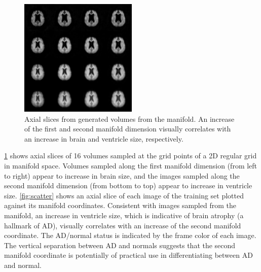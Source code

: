 \begin{figure}[tb!]
\centering
\includegraphics[width=0.5\textwidth, trim=0 0em 0 0]
  {figures/MICCAI2013_sampled2d}

\caption[Axial slices from generated volumes from the manifold]{Axial slices
from generated volumes from the manifold. An increase of the first and second manifold dimension visually correlates with an increase in
brain and ventricle size, respectively.}
\label{fig:generated}
\end{figure}

\ref{fig:generated} shows axial slices of 16 volumes sampled at the
grid points of a 2D regular grid in manifold space. Volumes sampled along the
first manifold dimension (from left to right) appear to increase in brain size,
and the images sampled along the second manifold dimension (from bottom to top)
appear to increase in ventricle size. \ref{fig:scatter} shows an axial slice of
each image of the training set plotted against its manifold coordinates.
Consistent with images sampled from the manifold, an increase in ventricle size,
which is indicative of brain atrophy (a hallmark of AD), visually correlates
with an increase of the second manifold coordinate.
The AD/normal status is indicated by the frame color of each image. The vertical
separation between AD and normals suggests that the second manifold coordinate is
potentially of practical use in differentiating between AD and normal.

